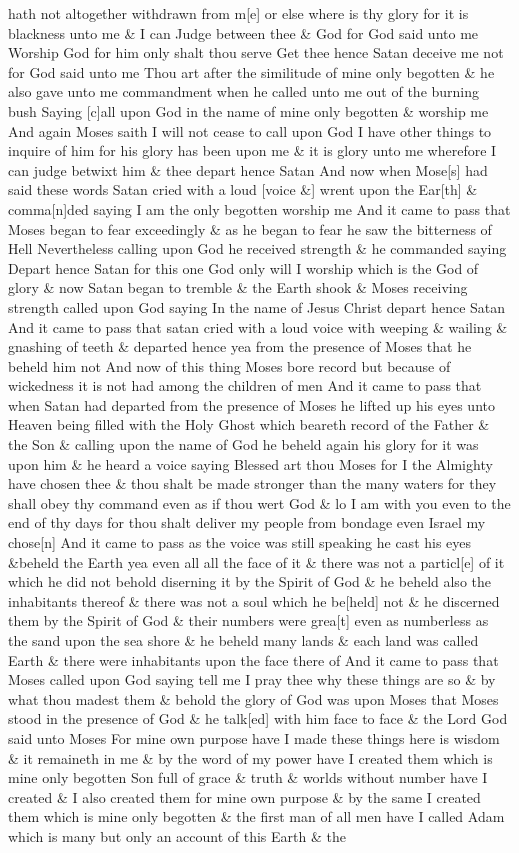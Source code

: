 hath not altogether withdrawn from m[e] or else where is thy glory for it is blackness unto me \& I can Judge between thee \& God for God said unto me Worship God for him only shalt thou serve Get thee hence Satan deceive me not for God said unto me Thou art after the similitude of mine only begotten \& he also gave unto me commandment when he called unto me out of the burning bush Saying [c]all upon God in the name of mine only begotten \& worship me And again Moses saith I will not cease to call upon God I have other things to inquire of him for his glory has been upon me \& it is glory unto me wherefore I can judge betwixt him \& thee depart hence Satan And now when Mose[s] had said these words Satan cried with a loud [voice \&] wrent upon the Ear[th] \& comma[n]ded saying I am the only begotten worship me And it came to pass that Moses began to fear exceedingly \& as he began to fear he saw the bitterness of Hell Nevertheless calling upon God he received strength \& he commanded saying Depart hence Satan for this one God only will I worship which is the God of glory \& now Satan began to tremble \& the Earth shook \& Moses receiving strength called upon God saying In the name of Jesus Christ depart hence Satan And it came to pass that satan cried with a loud voice with weeping \& wailing \& gnashing of teeth \& departed hence yea from the presence of Moses that he beheld him not And now of this thing Moses bore record but because of wickedness it is not had among the children of men And it came to pass that when Satan had departed from the presence of Moses he lifted up his eyes unto Heaven being filled with the Holy Ghost which beareth record of the Father \& the Son \& calling upon the name of God he beheld again his glory for it was upon him \& he heard a voice saying Blessed art thou Moses for I the Almighty have chosen thee \& thou shalt be made stronger than the many waters for they shall obey thy command even as if thou wert God \& lo I am with you even to the end of thy days for thou shalt deliver my people from bondage even Israel my chose[n] And it came to pass as the voice was still speaking he cast his eyes \&beheld the Earth yea even all all the face of it \& there was not a particl[e] of it which he did not behold diserning it by the Spirit of God \& he beheld also the inhabitants thereof \& there was not a soul which he be[held] not \& he discerned them by the Spirit of God \& their numbers were grea[t] even as numberless as the sand upon the sea shore \& he beheld many lands \& each land was called Earth \& there were inhabitants upon the face there of And it came to pass that Moses called upon God saying tell me I pray thee why these things are so \& by what thou madest them \& behold the glory of God was upon Moses that Moses stood in the presence of God \& he talk[ed] with him face to face \& the Lord God said unto Moses For mine own purpose have I made these things here is wisdom \& it remaineth in me \& by the word of my power have I created them which is mine only begotten Son full of grace \& truth \& worlds without number have I created \& I also created them for mine own purpose \& by the same I created them which is mine only begotten \& the first man of all men have I called Adam which is many but only an account of this Earth \& the 